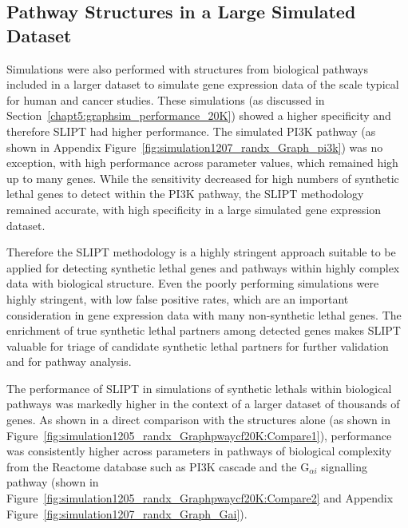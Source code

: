 \FloatBarrier

\subsection{Pathway Structures in a Large Simulated Dataset}
\label{chapt5:graphsim_performance_20K_pway}
\FloatBarrier

Simulations were also performed with  structures from biological pathways included in a larger dataset to simulate \gls{gene expression} data of the scale typical for human and cancer studies. These simulations (as discussed in Section~\ref{chapt5:graphsim_performance_20K}) showed a higher specificity and therefore \gls{SLIPT} had higher performance. The simulated PI3K pathway (as shown in Appendix Figure~\ref{fig:simulation1207_randx_Graph_pi3k}) was no exception, with high performance across parameter values, which remained high up to many genes. While the sensitivity decreased for high numbers of \gls{synthetic lethal} genes to detect within the PI3K pathway, the \gls{SLIPT} methodology remained accurate, with high specificity in a large simulated \gls{gene expression} dataset. 


Therefore the \gls{SLIPT} methodology is a highly stringent approach suitable to be applied for detecting \gls{synthetic lethal} genes and pathways within highly complex  data with biological  structure.  Even the poorly performing simulations were highly stringent, with low false positive rates, which are an important consideration \textcolor{black}{in} \gls{gene expression} data with many non-synthetic lethal genes. The enrichment of true \gls{synthetic lethal} partners among detected genes makes \gls{SLIPT} valuable for triage of candidate \gls{synthetic lethal} partners for further validation and for pathway analysis.

The performance of \gls{SLIPT} in simulations of \glspl{synthetic lethal} within biological pathways was markedly higher in the context of a larger dataset of thousands of genes. As shown in a direct comparison with the  structures alone (as shown in Figure~\ref{fig:simulation1205_randx_Graphpwaycf20K:Compare1}), performance was consistently higher across parameters in pathways of biological complexity from the Reactome database \citep{Reactome} such as PI3K cascade and the G$_{\alpha i}$ signalling pathway (shown in Figure~\ref{fig:simulation1205_randx_Graphpwaycf20K:Compare2} and Appendix Figure~\ref{fig:simulation1207_randx_Graph_Gai}). 

